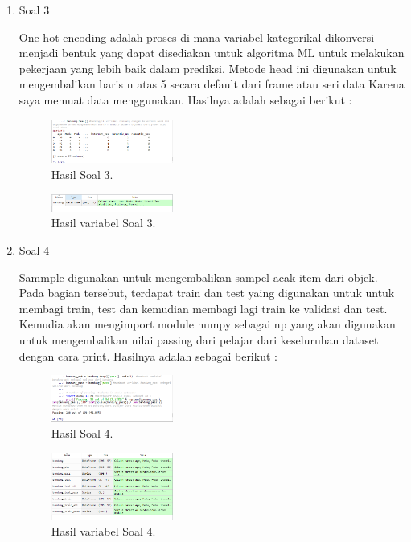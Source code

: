 \begin{enumerate}
	
	\item Soal 3
	\hfill\break
	
	One-hot encoding adalah proses di mana variabel kategorikal dikonversi menjadi bentuk yang dapat disediakan untuk algoritma ML untuk melakukan pekerjaan yang lebih baik dalam prediksi. Metode head ini digunakan untuk mengembalikan baris n atas 5 secara default dari frame atau seri data Karena saya memuat data menggunakan. Hasilnya adalah sebagai berikut :
	\begin{figure}[H]
	\centering
		\includegraphics[width=4cm]{figures/1174096/tugas2/2/hasil3.PNG}
		\caption{Hasil Soal 3.}
	\end{figure}
	\begin{figure}[H]
	\centering
		\includegraphics[width=4cm]{figures/1174096/tugas2/2/hasil3v.PNG}
		\caption{Hasil variabel Soal 3.}
	\end{figure}


	\item Soal 4
	\hfill\break
	
	Sammple digunakan untuk mengembalikan sampel acak item dari objek. Pada bagian tersebut, terdapat train dan test yaing digunakan untuk untuk membagi train, test dan kemudian membagi lagi train ke validasi dan test. Kemudia akan mengimport module numpy sebagai np yang akan digunakan untuk mengembalikan nilai passing dari pelajar dari keseluruhan dataset dengan cara print. Hasilnya adalah sebagai berikut :
	\begin{figure}[H]
	\centering
		\includegraphics[width=4cm]{figures/1174096/tugas2/2/hasil4.PNG}
		\caption{Hasil Soal 4.}
	\end{figure}
	\begin{figure}[H]
	\centering
		\includegraphics[width=4cm]{figures/1174096/tugas2/2/hasil4v.PNG}
		\caption{Hasil variabel Soal 4.}
	\end{figure}



\end{enumerate}

